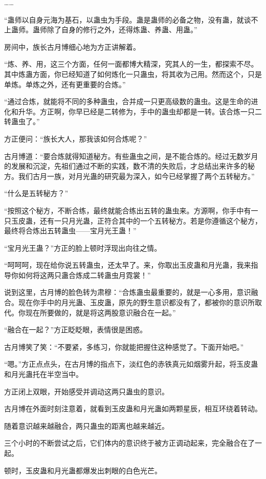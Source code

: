 \begin{this_body}
……

“蛊师以自身元海为基石，以蛊虫为手段。蛊是蛊师的必备之物，没有蛊，就谈不上蛊师。蛊师除了自身的修行之外，还得炼蛊、养蛊、用蛊。”

房间中，族长古月博细心地为方正讲解着。

“炼、养、用，这三个方面，任何一面都博大精深，究其人的一生，都探索不尽。其中炼蛊方面，你已经知道了如何炼化一只蛊虫，将其收为己用。然而这个，只是单炼。单炼之外，还有更重要的合炼。”

“通过合炼，就能将不同的多种蛊虫，合并成一只更高级数的蛊虫。这是生命的进化和升华。方正啊，你早已经是二转修为，手中的蛊虫却都是一转。该合炼一只二转蛊虫了。”

方正便问：“族长大人，那我该如何合炼呢？”

古月博道：“要合炼就得知道秘方。有些蛊虫之间，是不能合炼的。经过无数岁月的发展和沉淀，先祖们通过不断的实践，数不清的失败后，才总结出来许多的秘方。我们古月一族，对月光蛊的研究最为深入，如今已经掌握了两个五转秘方。”

“什么是五转秘方？”

“按照这个秘方，不断合练，最终就能合练出五转的蛊虫来。方源啊，你手中有一只玉皮蛊，还有一只月光蛊，正符合其中的一个五转秘方。若是你遵循这个秘方，最终将合炼出五转蛊虫——宝月光王蛊！”

“宝月光王蛊？”方正的脸上顿时浮现出向往之情。

“呵呵呵，现在给你说五转蛊虫，还太早了。来，你取出玉皮蛊和月光蛊，我来指导你如何将这两只蛊合炼成二转蛊虫月霓裳！”

说到这里，古月博的脸色转为肃穆：“合炼蛊虫最重要的，就是一心多用，意识融合。现在你手中的月光蛊、玉皮蛊，原先的野生意识都没有了，都被你的意识所取代。你现在所要做的，就是将这两股意识融合在一起。”

“融合在一起？”方正眨眨眼，表情很是困惑。

古月博笑了笑：“不要紧，多练习，你就能把握住这种感觉了。下面开始吧。”

“嗯。”方正点点头，在古月博的指点下，淡红色的赤铁真元如烟雾升起，将玉皮蛊和月光蛊托在半空当中。

方正闭上双眼，开始感受并调动这两只蛊虫的意识。

古月博在外面时刻注意着，就看到玉皮蛊和月光蛊如两颗星辰，相互环绕着转动。

随着意识越来越融合，两只蛊虫的距离也越来越近。

三个小时的不断尝试之后，它们体内的意识终于被方正调动起来，完全融合在了一起。

顿时，玉皮蛊和月光蛊都爆发出刺眼的白色光芒。


\end{this_body}
